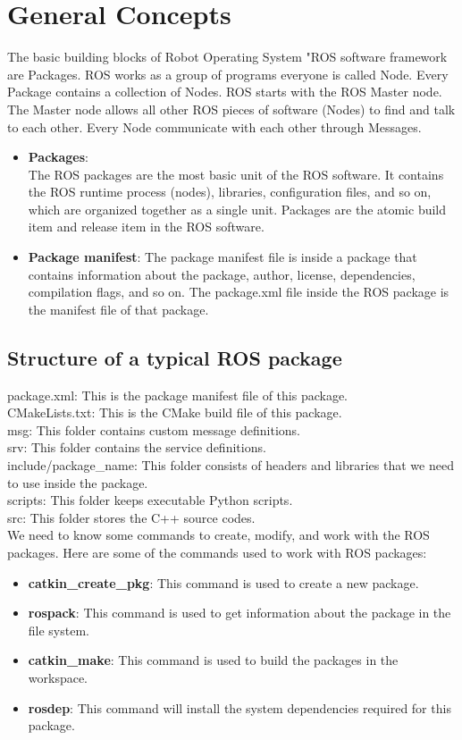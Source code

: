  \section{General Concepts}
 	The basic building blocks of Robot Operating System "ROS software framework are Packages. ROS works as a group of programs everyone is called Node. Every Package contains a collection of Nodes. ROS starts with the ROS Master node. The Master node allows all other ROS pieces of software (Nodes) to find and talk to each other. Every Node communicate with each other through Messages.
 	\begin{itemize}
 		\item \textbf{Packages}:\\
 		 The ROS packages are the most basic unit of the ROS software. It contains the ROS runtime process (nodes), libraries, configuration files, and so on, which are organized together as a single unit. Packages are the atomic build item and release item in the ROS software. 
 		 \item \textbf{Package manifest}: The package manifest file is inside a package that contains information about the package, author, license, dependencies, compilation flags, and so on. The package.xml file inside the ROS package is the manifest file of that package.
 	\end{itemize}
 	
	\subsection{Structure of a typical ROS package}
	package.xml: This is the package manifest file of this package.\\
    CMakeLists.txt: This is the CMake build file of this package.\\
    msg: This folder contains custom message definitions.\\
    srv: This folder contains the service definitions. \\
    include/package\_name: This folder consists of headers and libraries that we need to use inside the package. \\
    scripts: This folder keeps executable Python scripts. \\
    src: This folder stores the C++ source codes.\\
    We need to know some commands to create, modify, and work with the ROS packages.
    Here are some of the commands used to work with ROS packages:
    \begin{itemize}
    	\item \textbf{catkin\_create\_pkg}: This command is used to create a new package.
    	\item \textbf{rospack}: This command is used to get information about the package in the file system.
    	\item \textbf{catkin\_make}: This command is used to build the packages in the workspace.
    	\item \textbf{rosdep}: This command will install the system dependencies required for this package.
    \end{itemize}

